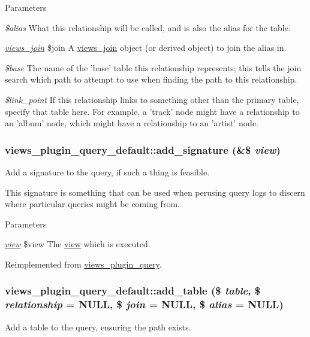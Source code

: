 \begin{DoxyParams}{Parameters}
\item[{\em \$alias}]What this relationship will be called, and is also the alias for the table. \item[{\em \hyperlink{classviews__join}{views\_\-join}}]\$join A \hyperlink{classviews__join}{views\_\-join} object (or derived object) to join the alias in. \item[{\em \$base}]The name of the 'base' table this relationship represents; this tells the join search which path to attempt to use when finding the path to this relationship. \item[{\em \$link\_\-point}]If this relationship links to something other than the primary table, specify that table here. For example, a 'track' node might have a relationship to an 'album' node, which might have a relationship to an 'artist' node. \end{DoxyParams}
\hypertarget{classviews__plugin__query__default_a24253e8f12ec25b6a16413d6b5659547}{
\subsubsection[{add\_\-signature}]{\setlength{\rightskip}{0pt plus 5cm}views\_\-plugin\_\-query\_\-default::add\_\-signature (\&\$ {\em view})}}
\label{classviews__plugin__query__default_a24253e8f12ec25b6a16413d6b5659547}
Add a signature to the query, if such a thing is feasible.

This signature is something that can be used when perusing query logs to discern where particular queries might be coming from.


\begin{DoxyParams}{Parameters}
\item[{\em \hyperlink{classview}{view}}]\$view The \hyperlink{classview}{view} which is executed. \end{DoxyParams}


Reimplemented from \hyperlink{classviews__plugin__query_ac6c76ccb108e97f5662bec62877894f4}{views\_\-plugin\_\-query}.\hypertarget{classviews__plugin__query__default_a5a5bdfd26f77b8063efb0f6df5d9a232}{
\subsubsection[{add\_\-table}]{\setlength{\rightskip}{0pt plus 5cm}views\_\-plugin\_\-query\_\-default::add\_\-table (\$ {\em table}, \/  \$ {\em relationship} = {\ttfamily NULL}, \/  \$ {\em join} = {\ttfamily NULL}, \/  \$ {\em alias} = {\ttfamily NULL})}}
\label{classviews__plugin__query__default_a5a5bdfd26f77b8063efb0f6df5d9a232}
Add a table to the query, ensuring the path exists.

